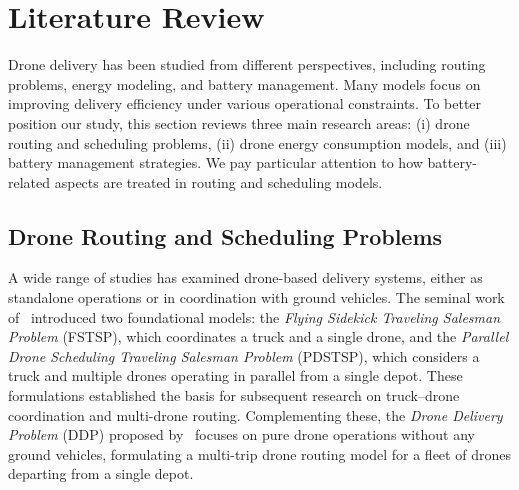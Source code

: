 \documentclass[3p, authoryear, 11pt]{elsarticle}
\begin{document}
\section{Literature Review}
\label{sec:literature_review}

Drone delivery has been studied from different perspectives, including routing problems, energy modeling, and battery management. 
Many models focus on improving delivery efficiency under various operational constraints. 
To better position our study, this section reviews three main research areas: 
(i) drone routing and scheduling problems, 
(ii) drone energy consumption models, and 
(iii) battery management strategies. 
We pay particular attention to how battery-related aspects are treated in routing and scheduling models.

\subsection{Drone Routing and Scheduling Problems}

A wide range of studies has examined drone-based delivery systems, either as standalone operations or in coordination with ground vehicles. 
The seminal work of~\citet{murray_flying_2015} introduced two foundational models: the \textit{Flying Sidekick Traveling Salesman Problem} (FSTSP), which coordinates a truck and a single drone, and the \textit{Parallel Drone Scheduling Traveling Salesman Problem} (PDSTSP), which considers a truck and multiple drones operating in parallel from a single depot. These formulations established the basis for subsequent research on truck–drone coordination and multi-drone routing. Complementing these, the \textit{Drone Delivery Problem} (DDP) proposed by~\citet{dorling_vehicle_2017} focuses on pure drone operations without any ground vehicles, formulating a multi-trip drone routing model for a fleet of drones departing from a single depot.
\end{document}
